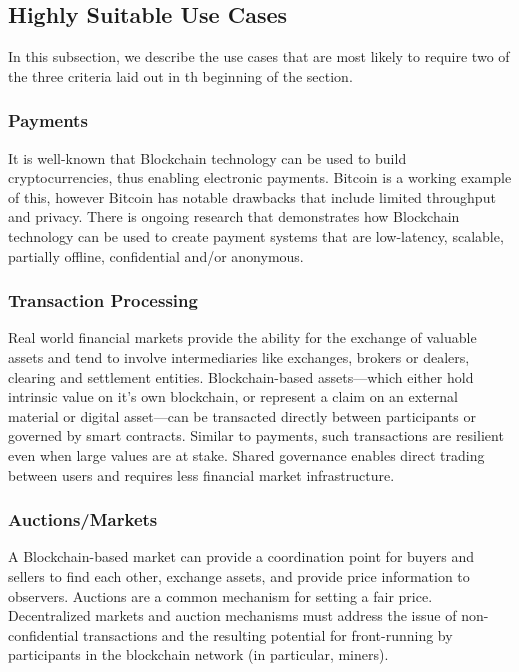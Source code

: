 \subsection{Highly Suitable Use Cases}
In this subsection, we describe the use cases that are most likely to require two of the three criteria laid out in th beginning of the section.

\subsubsection{Payments}
It is well-known that Blockchain technology can be used to build cryptocurrencies, thus enabling electronic payments.
Bitcoin is a working example of this, however Bitcoin has notable drawbacks that include limited throughput and privacy.
There is ongoing research that demonstrates how Blockchain technology can be used to create payment systems that are low-latency, scalable, partially offline, confidential and/or anonymous.

\subsubsection{Transaction Processing} %
Real world financial markets provide the ability for the exchange of valuable assets and tend to involve intermediaries like exchanges, brokers or dealers, clearing and settlement entities. 
Blockchain-based assets---which either hold intrinsic value on it's own blockchain, or represent a claim on an external material or digital asset---can be transacted directly between participants or governed by smart contracts.
Similar to payments, such transactions are resilient even when large values are at stake.
Shared governance enables direct trading between users and requires less financial market infrastructure.  

\subsubsection{Auctions/Markets}
A Blockchain-based market can provide a coordination point for buyers and sellers to find each other, exchange assets, and provide price information to observers. 
Auctions are a common mechanism for setting a fair price. 
Decentralized markets and auction mechanisms must address the issue of non-confidential transactions and the resulting potential for front-running by participants in the blockchain network (in particular, miners).

